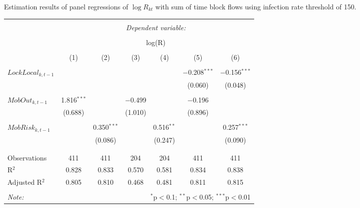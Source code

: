   \caption{Estimation results of panel regressions of $\log R_{kt}$ with sum of time block flows using infection rate threshold of 150.} 
  \label{} 
\small 
\begin{tabular}{@{\extracolsep{5pt}}lcccccc} 
\\[-1.8ex]\hline 
\hline \\[-1.8ex] 
 & \multicolumn{6}{c}{\textit{Dependent variable:}} \\ 
\cline{2-7} 
\\[-1.8ex] & \multicolumn{6}{c}{log(R)} \\ 
\\[-1.8ex] & (1) & (2) & (3) & (4) & (5) & (6)\\ 
\hline \\[-1.8ex] 
 $LockLocal_{k,t-1}$ &  &  &  &  & $-$0.208$^{***}$ & $-$0.156$^{***}$ \\ 
  &  &  &  &  & (0.060) & (0.048) \\ 
  & & & & & & \\ 
 $MobOut_{k,t-1}$ & 1.816$^{***}$ &  & $-$0.499 &  & $-$0.196 &  \\ 
  & (0.688) &  & (1.010) &  & (0.896) &  \\ 
  & & & & & & \\ 
 $MobRisk_{k,t-1}$ &  & 0.350$^{***}$ &  & 0.516$^{**}$ &  & 0.257$^{***}$ \\ 
  &  & (0.086) &  & (0.247) &  & (0.090) \\ 
  & & & & & & \\ 
\hline \\[-1.8ex] 
Observations & 411 & 411 & 204 & 204 & 411 & 411 \\ 
R$^{2}$ & 0.828 & 0.833 & 0.570 & 0.581 & 0.834 & 0.838 \\ 
Adjusted R$^{2}$ & 0.805 & 0.810 & 0.468 & 0.481 & 0.811 & 0.815 \\ 
\hline 
\hline \\[-1.8ex] 
\textit{Note:}  & \multicolumn{6}{r}{$^{*}$p$<$0.1; $^{**}$p$<$0.05; $^{***}$p$<$0.01} \\ 
\end{tabular} 


